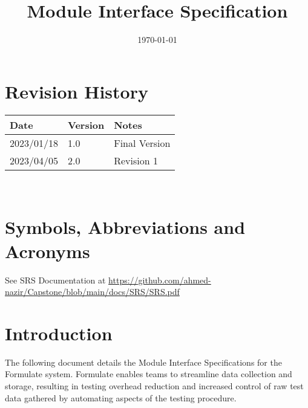 \documentclass[12pt, titlepage]{article}
\begin{document}
\title{\huge Module Interface Specification \\\progname{}}

\author{\authname}

\date{\today}

\maketitle


\section{Revision History}

\begin{tabularx}{\textwidth}{p{3cm}p{2cm}X}
\toprule {\bf Date} & {\bf Version} & {\bf Notes}\\
\midrule
2023/01/18 & 1.0 & Final Version\\
2023/04/05 & 2.0 & Revision 1\\
\bottomrule
\end{tabularx}

~\newpage

\section{Symbols, Abbreviations and Acronyms}

See SRS Documentation at \url{https://github.com/ahmed-nazir/Capstone/blob/main/docs/SRS/SRS.pdf} 


\newpage

\tableofcontents

\newpage


\section{Introduction}

The following document details the Module Interface Specifications for the Formulate system. Formulate enables teams to streamline data collection and storage, resulting in testing overhead reduction and increased control of raw test data gathered by automating aspects of the testing procedure. \\
\end{document}

